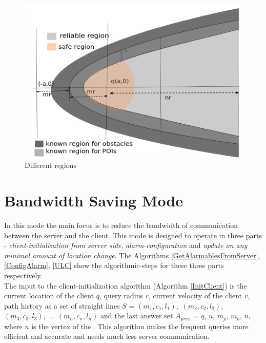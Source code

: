 \begin{figure}[h]
  \includegraphics[width=\linewidth]{regions_def.png}
  \caption{Different regions}
  \label{fig:regions}
\end{figure}


\section{Bandwidth Saving Mode}
\label{BWS}
In this mode the main focus is to reduce the bandwidth of communication between the server and the client. This mode is designed to operate in three parts - \textit{client-initialization from server side}, \textit{alarm-configuration} and \textit{update on any minimal amount of location change}. The Algorithms \ref{GetAlarmablesFromServer}, \ref{ConfigAlarm}, \ref{ULC} show the algorithmic-steps for these three parts respectively.\\

The input to the client-initialization algorithm (Algorithm \ref{InitClient}) is the current location of the client $q$, query radius $r$, current velocity of the client $v$, path history as a set of straight lines $S$ = {$(m_1, c_1, l_1),$ $(m_2, c_2, l_2),$ $(m_3, c_3, l_3),$ ... $(m_n, c_n, l_n)$} and the last answer set $A_{prev}$ = {$q$, $u$, $m_p$, $m_o$, $n$}, where $u$ is the vertex of the . This algorithm makes the frequent queries more efficient and accurate and needs much less server communication.


